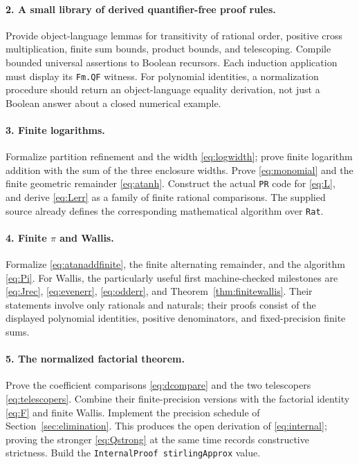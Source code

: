 \documentclass[11pt]{article}
\theoremstyle{definition}
\begin{document}
\paragraph{2. A small library of derived quantifier-free proof rules.}
Provide object-language lemmas for transitivity of rational order,
positive cross multiplication, finite sum bounds, product bounds, and
telescoping. Compile bounded universal assertions to Boolean recursors.
Each induction application must display its \texttt{Fm.QF} witness.
For polynomial identities, a normalization procedure should return an
object-language equality derivation, not just a Boolean answer about a
closed numerical example.

\paragraph{3. Finite logarithms.}
Formalize partition refinement and the width
\eqref{eq:logwidth}; prove finite logarithm addition with the sum of
the three enclosure widths. Prove \eqref{eq:monomial} and the
finite geometric remainder \eqref{eq:atanh}. Construct the actual
\texttt{PR} code for \eqref{eq:L}, and derive \eqref{eq:Lerr}
as a family of finite rational comparisons. The supplied source already
defines the corresponding mathematical algorithm over \texttt{Rat}.

\paragraph{4. Finite $\pi$ and Wallis.}
Formalize \eqref{eq:atanaddfinite}, the finite alternating remainder,
and the algorithm \eqref{eq:Pi}. For Wallis, the particularly useful
first machine-checked milestones are \eqref{eq:Jrec},
\eqref{eq:evenerr}, \eqref{eq:odderr}, and
Theorem~\ref{thm:finitewallis}. Their statements involve only
rationals and naturals; their proofs consist of the displayed polynomial
identities, positive denominators, and fixed-precision finite sums.

\paragraph{5. The normalized factorial theorem.}
Prove the coefficient comparisons \eqref{eq:dcompare} and the two
telescopers \eqref{eq:telescopers}. Combine their finite-precision
versions with the factorial identity \eqref{eq:F} and finite Wallis.
Implement the precision schedule of Section~\ref{sec:elimination}.
This produces the open derivation of \eqref{eq:internal}; proving the
stronger \eqref{eq:Qstrong} at the same time records constructive
strictness. Build the \texttt{InternalProof stirlingApprox} value.
\end{document}
